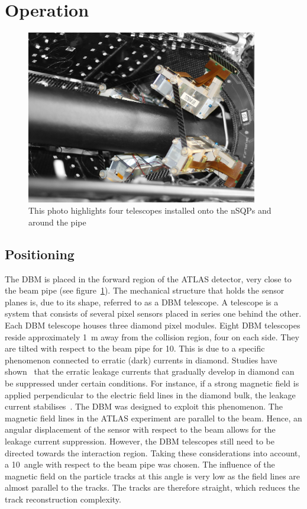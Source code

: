 \documentclass[twoside,12pt]{packages/mytustyle}  %
\begin{document}
\section{Operation}
\label{sec:operation}
\begin{figure}[!t]
\centering
\includegraphics[width=0.9\textwidth]{pics/DBM-installed-colour1}
\caption{This photo highlights four telescopes installed onto the nSQPs and around the pipe}
\label{fig:dbminatlas}
\end{figure}

\subsection{Positioning}
The DBM is placed in the forward region of the ATLAS detector, very close to the beam pipe (see figure~\ref{fig:dbminatlas}). The mechanical structure that holds the sensor planes is, due to its shape, referred to as a DBM telescope. A telescope is a system that consists of several pixel sensors placed in series one behind the other. Each DBM telescope houses three diamond pixel modules. Eight DBM telescopes reside approximately 1~m away from the collision region, four on each side. They are tilted with respect to the beam pipe for 10\textdegree. This is due to a specific phenomenon connected to erratic (dark) currents in diamond. Studies have shown~\cite{} that the erratic leakage currents that gradually develop in diamond can be suppressed under certain conditions. For instance, if a strong magnetic field is applied perpendicular to the electric field lines in the diamond bulk, the leakage current stabilises~\cite{}. The DBM was designed to exploit this phenomenon. The magnetic field lines in the ATLAS experiment are parallel to the beam. Hence, an angular displacement of the sensor with respect to the beam allows for the leakage current suppression. However, the DBM telescopes still need to be directed towards the interaction region. Taking these considerations into account, a 10\textdegree~angle with respect to the beam pipe was chosen. The influence of the magnetic field on the particle tracks at this angle is very low as the field lines are almost parallel to the tracks. The tracks are therefore straight, which reduces the track reconstruction complexity.
\end{document}
